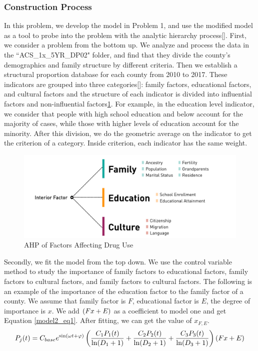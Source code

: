 \documentclass{mcmthesis}
\begin{document}
\subsubsection{Construction Process}
In this problem, we develop the model in Problem 1, and use the modified model as a tool to probe into the problem with the analytic hierarchy process[\cite{7}]. First, we consider a problem from the bottom up. We analyze and process the data in the ``ACS\_1x\_5YR\_DP02" folder, and find that they divide the county's demographics and family structure by different criteria. Then we establish a structural proportion database for each county from 2010 to 2017. These indicators are grouped into three categories[\cite{8}]: family factors, educational factors, and cultural factors and the structure of each indicator is divided into influential factors and non-influential factors\ref{model2_layer}. For example, in the education level indicator, we consider that people with high school education and below account for the majority of cases, while those with higher levels of education account for the minority. After this division, we do the geometric average on the indicator to get the criterion of a category. Inside criterion, each indicator has the same weight.
\begin{figure}[h]
	\centering
	\includegraphics[width=15cm]{figure-release/Model2.LayerMap.png}
	\caption{AHP of Factors Affecting Drug Use}\label{model2_layer}
\end{figure}

Secondly, we fit the model from the top down. We use the control variable method to study the importance of family factors to educational factors, family factors to cultural factors, and family factors to cultural factors. The following is an example of the importance of the education factor to the family factor of a county. We assume that family factor is $F$, educational factor is $E$, the degree of importance is $x$. We add $\left( F\*x+E\right) $ as a coefficient to model one and get Equation \eqref{model2_eq1}. After fitting, we can get the value of $x_{F,E}$.
\begin{equation}
P_{j}(t) = C_{base} e^{\sin (\omega t+\varphi)} \left(\frac{C_1 P_1(t)}{\ln (D_1+1)}+\frac{C_2 P_2(t)}{\ln (D_2+1)}+\frac{C_3 P_3(t)}{\ln (D_3+1)}\right)\left( F\*x+E\right)
\label{model2_eq1}
\end{equation}
\end{document}
